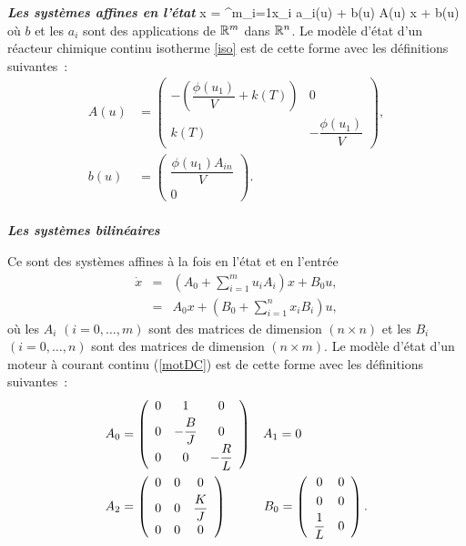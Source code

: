 \noindent \textbf{\textit{Les systèmes affines en l'état}}
\eqnn
\dot x = \sum^m_{i=1}x_i a_i(u) + b(u) \triangleq A(u) x + b(u) 
\eeqnn
où $b$ et les $a_i$ sont des applications de $\mathbb{R}^m$ dans $\mathbb{R}^n$. Le modèle d'état d'un réacteur chimique continu isotherme \eqref{iso} est de
cette forme avec les définitions suivantes~:
\begin{equation*} \begin{split}
A(u) &= \left(\begin{array}{cc}
-(\dfrac{\phi(u_1)}{V} +k(T)) & 0 \\[0.3em] k(T) & -\dfrac{ \phi(u_1)}{V}
\end{array} \right),\\[0.5em]
b(u) &=  \left(\begin{array}{c} \dfrac{ \phi(u_1) A_{in}}{V}\\[0.7em] 0
\end{array}\right).
\end{split} \end{equation*}\\

\noindent \textbf{\textit{Les systèmes bilinéaires}}
 
Ce sont des systèmes affines à la fois en l'état et en
l'entrée
\begin{eqnarray*}
\dot x &=& \left ( A_0 + \sum^m_{i=1} u_iA_i \right) x + B_0u, \\[0.3em]
&=& A_0x + (B_0+ \sum^n_{i=1} x_i B_i)u,
\end{eqnarray*}
où les $A_i$ $(i = 0, \ldots, m)$ sont des matrices de dimension $(n
\times n)$ et les $B_i$ $(i = 0, \ldots, n)$ sont des matrices de
dimension $(n \times m)$.  Le modèle d'état d'un moteur à courant continu
(\ref{motDC}) est de cette forme avec les définitions suivantes~:
\begin{equation*} \begin{split}
A_0 &= \left( \begin{array}{ccc}
0 & 1 & 0 \\[0.3em] 0 &-\dfrac{B}{J} & 0\\[0.3em]
0&0& -\dfrac{R}{L}
\end{array}
\right)\;\;\; A_1 = 0
\\
A_2 &= \left( \begin{array}{ccc}
0 & 0 & 0 \\[0.3em] 0 & 0 & \dfrac{K}{J} \\[0.5em]
0 & 0 & 0
\end{array}\right)\hspace*{10mm} B_0 = \left(\begin{array}{cc} 0 & 0 \\[0.3em] 0 & 0 \\[0.3em] \dfrac{1}{L}&0
\end{array} \right).
\end{split} \end{equation*}\\


